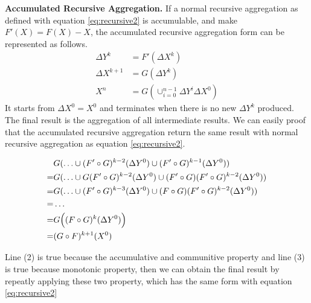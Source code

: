 {	\textbf{Accumulated Recursive Aggregation.} If a normal recursive aggregation  as defined with equation \ref{eq:recursive2} is accumulable, and make $F'(X)=F(X)-X$,  the accumulated recursive aggregation form can be represented as follows.
	\begin{equation}\label{eq:accumasync}
	\begin{aligned}
	\Delta Y^{k}&= F'(\Delta X^k)\\
	\Delta X^{k+1}&= G(\Delta Y^{k})\\
	X^{n}&=G(\cup_{i=0}^{n-1} \Delta Y^{i}\Delta X^0)
	\end{aligned}
	\end{equation}
	It starts from $\Delta X^0=X^0$ and terminates when there is no new $\Delta Y^k$ produced. The final result is the aggregation of all intermediate results. We can easily proof that the accumulated recursive aggregation return the same result with normal recursive aggregation as equation \ref{eq:recursive2}.
	
	\small

\begin{align}
&G( \ldots\cup (F'\circ G)^{k-2}(\Delta Y^0)\cup(F'\circ G)^{k-1}(\Delta Y^0))\notag \\
=&G( \ldots\cup G(F'\circ G)^{k-2}(\Delta Y^0)\cup(F'\circ G)(F'\circ G)^{k-2}(\Delta Y^0))\notag\\
=&G( \ldots\cup (F'\circ G)^{k-3}(\Delta Y^0)\cup(F\circ G)(F'\circ G)^{k-2}(\Delta Y^0))\notag\\
=& \ldots \notag \\
=&G\Big((F\circ G)^k(\Delta Y^0)\Big)\notag\\
=&(G \circ F)^{k+1}(X^0)\notag
\end{align}

	\normalsize
	Line (2) is true because the accumulative and communitive property and line (3) is true because monotonic property, then we can obtain the final result by repeatly applying these two property, which has the same form with equation \ref{eq:recursive2}

}
